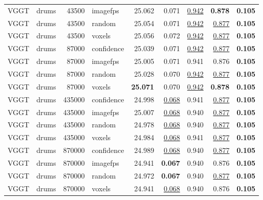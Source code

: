 \begin{table}[H]
\begin{tabular}{llrlrrrrr}
VGGT & drums & 43500 & imagefps & 25.062 & 0.071 & \underline{0.942} & \textbf{0.878} & \textbf{0.105} \\
VGGT & drums & 43500 & random & 25.054 & 0.071 & \underline{0.942} & \underline{0.877} & \textbf{0.105} \\
VGGT & drums & 43500 & voxels & 25.056 & 0.072 & \underline{0.942} & \underline{0.877} & \textbf{0.105} \\
VGGT & drums & 87000 & confidence & 25.039 & 0.071 & \underline{0.942} & \underline{0.877} & \textbf{0.105} \\
VGGT & drums & 87000 & imagefps & 25.005 & 0.071 & 0.941 & 0.876 & \textbf{0.105} \\
VGGT & drums & 87000 & random & 25.028 & 0.070 & \underline{0.942} & \underline{0.877} & \textbf{0.105} \\
VGGT & drums & 87000 & voxels & \textbf{25.071} & 0.070 & \underline{0.942} & \textbf{0.878} & \textbf{0.105} \\
VGGT & drums & 435000 & confidence & 24.998 & \underline{0.068} & 0.941 & \underline{0.877} & \textbf{0.105} \\
VGGT & drums & 435000 & imagefps & 25.007 & \underline{0.068} & 0.940 & \underline{0.877} & \textbf{0.105} \\
VGGT & drums & 435000 & random & 24.978 & \underline{0.068} & 0.940 & \underline{0.877} & \textbf{0.105} \\
VGGT & drums & 435000 & voxels & 24.984 & \underline{0.068} & 0.941 & \underline{0.877} & \textbf{0.105} \\
VGGT & drums & 870000 & confidence & 24.989 & \underline{0.068} & 0.940 & \underline{0.877} & \textbf{0.105} \\
VGGT & drums & 870000 & imagefps & 24.941 & \textbf{0.067} & 0.940 & 0.876 & \textbf{0.105} \\
VGGT & drums & 870000 & random & 24.972 & \textbf{0.067} & 0.940 & \underline{0.877} & \textbf{0.105} \\
VGGT & drums & 870000 & voxels & 24.941 & \underline{0.068} & 0.940 & 0.876 & \textbf{0.105} \\
\bottomrule
\end{tabular}
\end{table}